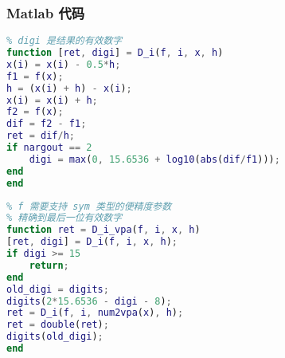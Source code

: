 \subsubsection{Matlab 代码}
\begin{lstlisting}[language=matlab, caption=D\_i.m]
% 数值偏偏导
% digi 是结果的有效数字
function [ret, digi] = D_i(f, i, x, h)
x(i) = x(i) - 0.5*h;
f1 = f(x);
h = (x(i) + h) - x(i);
x(i) = x(i) + h;
f2 = f(x);
dif = f2 - f1;
ret = dif/h;
if nargout == 2
    digi = max(0, 15.6536 + log10(abs(dif/f1)));
end
end
\end{lstlisting}

\begin{lstlisting}[language=matlab, caption=D\_i\_vpa.m]
% 数值偏导 (变精度)
% f 需要支持 sym 类型的便精度参数
% 精确到最后一位有效数字
function ret = D_i_vpa(f, i, x, h)
[ret, digi] = D_i(f, i, x, h);
if digi >= 15
    return;
end
old_digi = digits;
digits(2*15.6536 - digi - 8);
ret = D_i(f, i, num2vpa(x), h);
ret = double(ret);
digits(old_digi);
end
\end{lstlisting}
